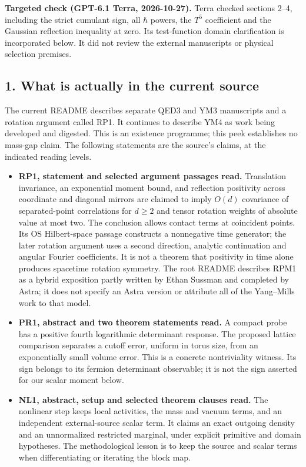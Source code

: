 \documentclass[11pt,a4paper]{article}
\newcommand{\tightlist}{\setlength{\itemsep}{0pt}\setlength{\parskip}{0pt}}
\begin{document}
\textbf{Targeted check (GPT-6.1 Terra, 2026-10-27).} Terra checked
sections 2--4, including the strict cumulant sign, all \(\hbar\) powers,
the \(T^5\) coefficient and the Gaussian reflection inequality at zero.
Its test-function domain clarification is incorporated below. It did not
review the external manuscripts or physical selection premises.

\subsection{1. What is actually in the current
source}\label{what-is-actually-in-the-current-source}

The current README describes separate QED3 and YM3 manuscripts and a
rotation argument called RP1. It continues to describe YM4 as work being
developed and digested. This is an existence programme; this peek
establishes no mass-gap claim. The following statements are the source's
claims, at the indicated reading levels.

\begin{itemize}
\tightlist
\item
  \textbf{RP1, statement and selected argument passages read.}
  Translation invariance, an exponential moment bound, and reflection
  positivity across coordinate and diagonal mirrors are claimed to imply
  \(O(d)\) covariance of separated-point correlations for \(d\ge2\) and
  tensor rotation weights of absolute value at most two. The conclusion
  allows contact terms at coincident points. Its OS Hilbert-space
  passage constructs a nonnegative time generator; the later rotation
  argument uses a second direction, analytic continuation and angular
  Fourier coefficients. It is not a theorem that positivity in time
  alone produces spacetime rotation symmetry. The root README describes
  RPM1 as a hybrid exposition partly written by Ethan Sussman and
  completed by Astra; it does not specify an Astra version or attribute
  all of the Yang--Mills work to that model.
\item
  \textbf{PR1, abstract and two theorem statements read.} A compact
  probe has a positive fourth logarithmic determinant response. The
  proposed lattice comparison separates a cutoff error, uniform in torus
  size, from an exponentially small volume error. This is a concrete
  nontriviality witness. Its sign belongs to its fermion determinant
  observable; it is not the sign asserted for our scalar moment below.
\item
  \textbf{NL1, abstract, setup and selected theorem clauses read.} The
  nonlinear step keeps local activities, the mass and vacuum terms, and
  an independent external-source scalar term. It claims an exact
  outgoing density and an unnormalized restricted marginal, under
  explicit primitive and domain hypotheses. The methodological lesson is
  to keep the source and scalar terms when differentiating or iterating
  the block map.
\end{itemize}
\end{document}
